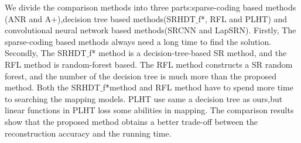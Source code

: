 \documentclass[review,numbers,sort&compress]{elsarticle}  %
\begin{document}
We divide the comparison methods into three parts:sparse-coding based methods (ANR and A+),decision tree based methods(SRHDT$\_$f*, RFL and PLHT) and convolutional neural network based methods(SRCNN and LapSRN). Firstly, The sparse-coding based methods always need a long time to find the solution. Secondly, The SRHDT$\_$f* method is a decision-tree-based SR method, and the RFL method is random-forest based. The RFL method constructs a SR random forest, and the number of the decision tree is much more than the proposed method. Both the SRHDT$\_$f*method and RFL method have to spend more time to searching the mapping models. PLHT use same a decision tree as ours,but linear functions in PLHT loss some abilities in mapping. The comparison results show that the proposed method obtains a better trade-off between the reconstruction accuracy and the running time.
\end{document}
